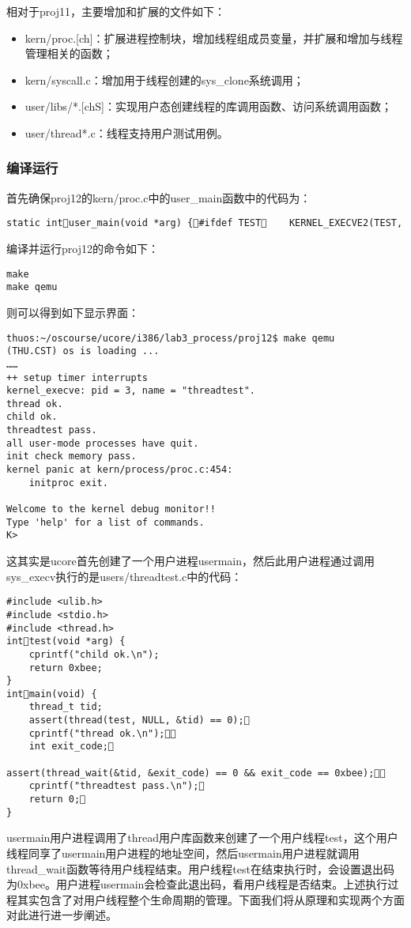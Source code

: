 相对于proj11，主要增加和扩展的文件如下：

\begin{itemize}
\item
  kern/proc.{[}ch{]}：扩展进程控制块，增加线程组成员变量，并扩展和增加与线程管理相关的函数；
\item
  kern/syscall.c：增加用于线程创建的sys\_clone系统调用；
\item
  user/libs/*.{[}chS{]}：实现用户态创建线程的库调用函数、访问系统调用函数；
\item
  user/thread*.c：线程支持用户测试用例。
\end{itemize}

\subsubsection{编译运行}\label{ux7f16ux8bd1ux8fd0ux884c}

首先确保proj12的kern/proc.c中的user\_main函数中的代码为：

\begin{lstlisting}
static intuser_main(void *arg) {#ifdef TEST    KERNEL_EXECVE2(TEST, TESTSTART, TESTSIZE);#else    KERNEL_EXECVE(threadtest);#endif    panic("user_main execve failed.\n");}
\end{lstlisting}

编译并运行proj12的命令如下：

\begin{lstlisting}
make
make qemu
\end{lstlisting}

则可以得到如下显示界面：

\begin{lstlisting}
thuos:~/oscourse/ucore/i386/lab3_process/proj12$ make qemu
(THU.CST) os is loading ...
……
++ setup timer interrupts
kernel_execve: pid = 3, name = "threadtest".
thread ok.
child ok.
threadtest pass.
all user-mode processes have quit.
init check memory pass.
kernel panic at kern/process/proc.c:454:
    initproc exit.

Welcome to the kernel debug monitor!!
Type 'help' for a list of commands.
K>
\end{lstlisting}

这其实是ucore首先创建了一个用户进程usermain，然后此用户进程通过调用sys\_execv执行的是users/threadtest.c中的代码：

\begin{lstlisting}
#include <ulib.h>
#include <stdio.h>
#include <thread.h>
inttest(void *arg) {
    cprintf("child ok.\n");
    return 0xbee;
}
intmain(void) {
    thread_t tid;
    assert(thread(test, NULL, &tid) == 0);   
    cprintf("thread ok.\n");    
    int exit_code;    
    assert(thread_wait(&tid, &exit_code) == 0 && exit_code == 0xbee);    
    cprintf("threadtest pass.\n");    
    return 0;
}
\end{lstlisting}

usermain用户进程调用了thread用户库函数来创建了一个用户线程test，这个用户线程同享了usermain用户进程的地址空间，然后usermain用户进程就调用thread\_wait函数等待用户线程结束。用户线程test在结束执行时，会设置退出码为0xbee。用户进程usermain会检查此退出码，看用户线程是否结束。上述执行过程其实包含了对用户线程整个生命周期的管理。下面我们将从原理和实现两个方面对此进行进一步阐述。
